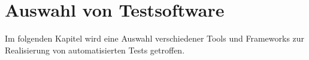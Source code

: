 \documentclass[a4paper,12pt,headsepline]{scrartcl}
\begin{document}


\setlength{\columnsep}{25pt}

\newpage
\fancyhead[L]{\nouppercase{\leftmark}} %

\onehalfspacing



\newpage


\newpage
%
\section{Auswahl von Testsoftware}
Im folgenden Kapitel wird eine Auswahl verschiedener Tools und Frameworks zur Realisierung von automatisierten Tests getroffen.




\newpage


\newpage



\onecolumn
\singlespacing
\newpage
{}
\renewcommand\refname{Literaturverzeichnis}
\printbibliography



\newpage
{}
\printnomenclature

\onehalfspacing
\newpage
{}




\newpage
\thispagestyle{empty} %
\section*{ }
\end{document}
